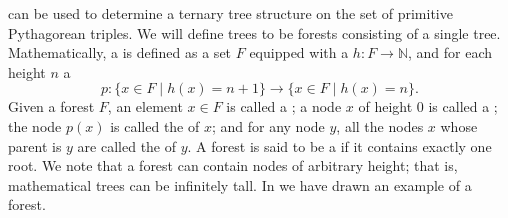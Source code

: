  can be used to determine a ternary tree structure on the set of primitive Pythagorean triples. We will define trees to be forests consisting of a single tree. Mathematically, a  is defined as a set $F$ equipped with a  $h:F\to \mathbb{N}$, and for each height $n$ a 
\begin{equation*}
  p : \{x\in F\mid h(x)=n+1\}\to \{x\in F\mid h(x)=n\}.
\end{equation*}
Given a forest $F$, an element $x\in F$ is called a ; a node $x$ of height $0$ is called a ; the node $p(x)$ is called the  of $x$; and for any node $y$, all the nodes $x$ whose parent is $y$ are called the  of $y$. A forest is said to be a  if it contains exactly one root. We note that a forest can contain nodes of arbitrary height; that is, mathematical trees can be infinitely tall. In  we have drawn an example of a forest.


